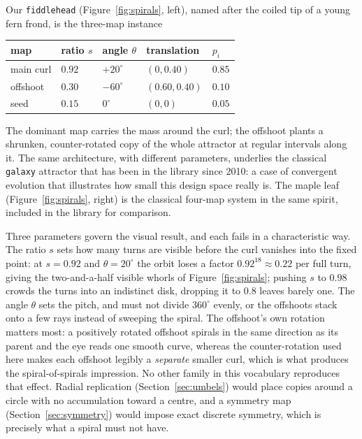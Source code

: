 \documentclass[11pt,a4paper]{article}
\theoremstyle{remark}
\begin{document}
Our \texttt{fiddlehead} (Figure~\ref{fig:spirals}, left), named after the
coiled tip of a young fern frond, is the three-map instance
\begin{center}
\begin{tabular}{lllll}
\toprule
map & ratio $s$ & angle $\theta$ & translation & $p_i$ \\
\midrule
main curl & $0.92$ & $+20^\circ$ & $(0, 0.40)$ & $0.85$ \\
offshoot  & $0.30$ & $-60^\circ$ & $(0.60, 0.40)$ & $0.10$ \\
seed      & $0.15$ & $0^\circ$   & $(0,0)$ & $0.05$ \\
\bottomrule
\end{tabular}
\end{center}
The dominant map carries the mass around the curl; the offshoot plants a
shrunken, counter-rotated copy of the whole attractor at regular intervals
along it. The same architecture, with different parameters, underlies the
classical \texttt{galaxy} attractor that has been in the library since 2010:
a case of convergent evolution that illustrates how small this design space
really is. The maple leaf (Figure~\ref{fig:spirals}, right) is the classical
four-map system in the same spirit, included in the library for comparison.

Three parameters govern the visual result, and each fails in a
characteristic way. The ratio $s$ sets how many turns are visible before the
curl vanishes into the fixed point: at $s = 0.92$ and $\theta = 20^\circ$
the orbit loses a factor $0.92^{18} \approx 0.22$ per full turn, giving the
two-and-a-half visible whorls of Figure~\ref{fig:spirals}; pushing $s$ to
$0.98$ crowds the turns into an indistinct disk, dropping it to $0.8$ leaves
barely one. The angle $\theta$ sets the pitch, and must not divide $360^\circ$
evenly, or the offshoots stack onto a few rays instead of sweeping the
spiral. The offshoot's own rotation matters most: a positively rotated
offshoot spirals in the same direction as its parent and the eye reads one
smooth curve, whereas the counter-rotation used here makes each offshoot
legibly a \emph{separate} smaller curl, which is what produces the
spiral-of-spirals impression. No other family in this vocabulary reproduces
that effect. Radial replication (Section~\ref{sec:umbels}) would place
copies around a circle with no accumulation toward a centre, and a symmetry
map (Section~\ref{sec:symmetry}) would impose exact discrete symmetry, which
is precisely what a spiral must not have.
\end{document}
